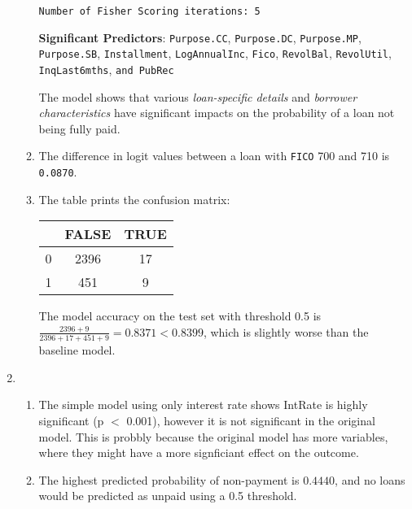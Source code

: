 \documentclass{article}
\begin{document}
\begin{enumerate}[label=\alph*.]
\begin{enumerate}[label=\roman*.]
\begin{verbatim}
Number of Fisher Scoring iterations: 5
                              \end{verbatim}

                        \textbf{Significant Predictors}: \texttt{Purpose.CC}, \texttt{Purpose.DC}, \texttt{Purpose.MP}, \texttt{Purpose.SB}, \texttt{Installment}, \texttt{LogAnnualInc}, \texttt{Fico}, \texttt{RevolBal}, \texttt{RevolUtil}, \texttt{InqLast6mths}, \texttt{and PubRec}

                        The model shows that various \textit{loan-specific details} and \textit{borrower characteristics} have significant impacts on the probability of a loan not being fully paid.


                  \item The difference in logit values between a loan with \texttt{FICO} 700 and 710 is \texttt{0.0870}.

                  \item The table prints the confusion matrix:
                        \begin{table}[H]
                              \centering
                              \begin{tabular}{ccc}
                                      & FALSE & TRUE \\
                                    \hline
                                    0 & 2396  & 17   \\
                                    1 & 451   & 9
                              \end{tabular}
                        \end{table}
                        The model accuracy on the test set with threshold 0.5 is $\frac{2396 + 9}{2396 + 17 + 451 + 9}= 0.8371 < 0.8399$, which is slightly worse than the baseline model.

            \end{enumerate}

      \item
            \begin{enumerate}[label=\roman*.]
                  \item The simple model using only interest rate shows IntRate is highly significant (p $<$ 0.001), however it is not significant in the original model. This is probbly because the original model has more variables, where they might have a more signficiant effect on the outcome.

                  \item The highest predicted probability of non-payment is $0.4440$, and no loans would be predicted as unpaid using a 0.5 threshold.
            \end{enumerate}
\end{enumerate}
\end{document}
